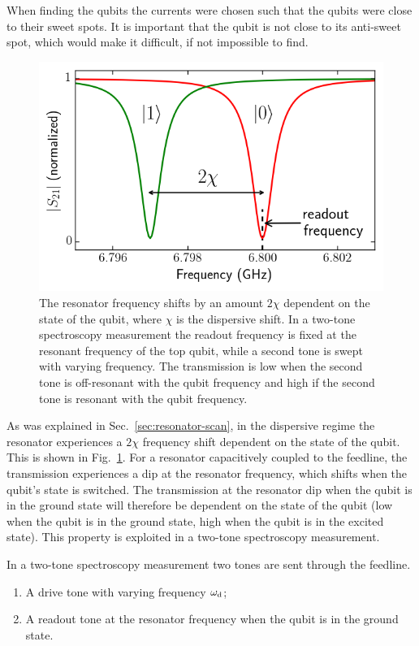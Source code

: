         When finding the qubits the currents were chosen such that the qubits were close to their sweet spots. It is important that the qubit is not close to its anti-sweet spot, which would make it difficult, if not impossible to find.

        \begin{figure}[tb]
          \centering
          \includegraphics[width=.5\textwidth]{Figures/Qubit characterization/dispersive shift.png}
          \caption{The resonator frequency shifts by an amount $2\chi$ dependent on the state of the qubit, where $\chi$ is the dispersive shift. In a two-tone spectroscopy measurement the readout frequency is fixed at the resonant frequency of the top qubit, while a second tone is swept with varying frequency. The transmission is low when the second tone is off-resonant with the qubit frequency and high if the second tone is resonant with the qubit frequency.}
          \label{fig:dispersive shift}
        \end{figure}

        As was explained in Sec.~\ref{sec:resonator-scan}, in the dispersive regime the resonator experiences a $2 \chi$ frequency shift dependent on the state of the qubit. This is shown in Fig.~\ref{fig:dispersive shift}. For a resonator capacitively coupled to the feedline, the transmission experiences a dip at the resonator frequency, which shifts when the qubit's state is switched. The transmission at the resonator dip when the qubit is in the ground state will therefore be dependent on the state of the qubit (low when the qubit is in the ground state, high when the qubit is in the excited state). This property is exploited in a two-tone spectroscopy measurement.

        In a two-tone spectroscopy measurement two tones are sent through the feedline.
        \begin{enumerate}
          \item A drive tone with varying frequency $\omega_\text{d}$;
          \item A readout tone at the resonator frequency when the qubit is in the ground state.
        \end{enumerate}

